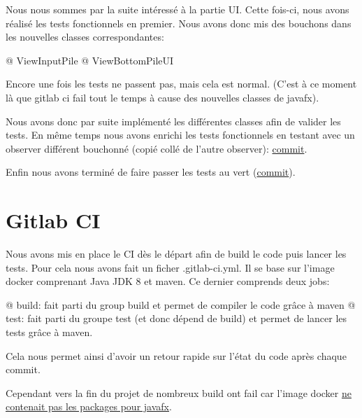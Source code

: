\documentclass{report}
\begin{document}
			Nous nous sommes par la suite intéressé à la partie UI.
			Cette fois-ci, nous avons réalisé les tests fonctionnels en premier.
			Nous avons donc mis des bouchons dans les nouvelles classes correspondantes:
			\begin{easylist}
				@ ViewInputPile
				@ ViewBottomPileUI
			\end{easylist}
			
			
			Encore une fois les tests ne passent pas, mais cela est normal.
			(C'est à ce moment là que gitlab ci fail tout le temps à cause des nouvelles classes de javafx).
			
			Nous avons donc par suite implémenté les différentes classes afin de valider les tests.
			En même temps nous avons enrichi les tests fonctionnels en testant avec un observer différent bouchonné (copié collé de l'autre observer): \href{https://gitlab.com/MrCraftCod/conduitedetests/commit/0f9b8a439066373ea5623b0e879605113b1d7466}{commit}.
			
			Enfin nous avons terminé de faire passer les tests au vert (\href{https://gitlab.com/MrCraftCod/conduitedetests/commit/a7772a6276237ef56cd9f565a98b1f1c377e7b72}{commit}).
			
		
		\section{Gitlab CI}
			Nous avons mis en place le CI dès le départ afin de build le code puis lancer les tests.
			Pour cela nous avons fait un ficher .gitlab-ci.yml.
			Il se base sur l'image docker comprenant Java JDK 8 et maven.
			Ce dernier comprends deux jobs:
			\begin{easylist}
				@ build: fait parti du group build et permet de compiler le code grâce à maven
				@ test: fait parti du groupe test (et donc dépend de build) et permet de lancer les tests grâce à maven.
			\end{easylist}
			
			Cela nous permet ainsi d'avoir un retour rapide sur l'état du code après chaque commit.
			
			Cependant vers la fin du projet de nombreux build ont fail car l'image docker \href{https://gitlab.com/MrCraftCod/conduitedetests/commit/6b5ea1dc8aaa866efded8a992ad19aa621aaa92f}{ne contenait pas les packages pour javafx}.
\end{document}
